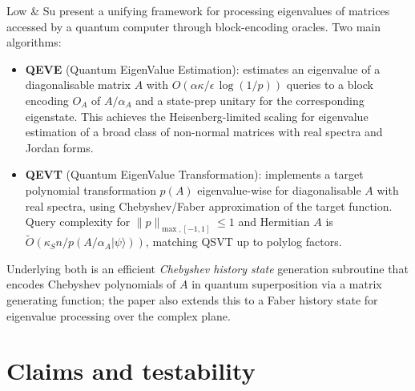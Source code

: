 \documentclass[11pt]{article}
\begin{document}
Low \& Su present a unifying framework for processing eigenvalues of
matrices accessed by a quantum computer through block-encoding oracles.
Two main algorithms:
\begin{itemize}
  \item \textbf{QEVE} (Quantum EigenValue Estimation): estimates an
        eigenvalue of a diagonalisable matrix $A$ with
        $O(\alpha \kappa / \epsilon \, \log(1/p))$ queries to a block
        encoding $O_A$ of $A/\alpha_A$ and a state-prep unitary for the
        corresponding eigenstate. This achieves the Heisenberg-limited
        scaling for eigenvalue estimation of a broad class of non-normal
        matrices with real spectra and Jordan forms.
  \item \textbf{QEVT} (Quantum EigenValue Transformation): implements a
        target polynomial transformation $p(A)$ eigenvalue-wise for
        diagonalisable $A$ with real spectra, using Chebyshev/Faber
        approximation of the target function.  Query complexity for
        $\|p\|_{\max,[-1,1]} \le 1$ and Hermitian $A$ is
        $\tilde O\!\left( \kappa_S n / p(A/\alpha_A|\psi\rangle) \right)$,
        matching QSVT up to polylog factors.
\end{itemize}
Underlying both is an efficient \emph{Chebyshev history state}
generation subroutine that encodes Chebyshev polynomials of $A$ in
quantum superposition via a matrix generating function; the paper also
extends this to a Faber history state for eigenvalue processing over
the complex plane.

\section{Claims and testability}
\end{document}
